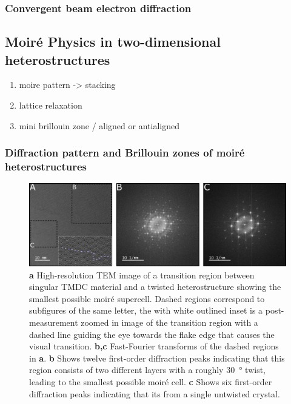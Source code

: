 \subsubsection{Convergent beam electron diffraction}



\subsection{Moiré Physics in two-dimensional heterostructures}
\begin{enumerate}
    \item moire pattern -> stacking
    \item lattice relaxation
    \item mini brillouin zone / aligned or antialigned
\end{enumerate}

\subsubsection{Diffraction pattern and Brillouin zones of moiré heterostructures}
\begin{figure}[h]
    \centering
    \includegraphics[width=1\linewidth, keepaspectratio]{resources/Figures/moire_transition.png}
    \caption{\textbf{a} High-resolution TEM image of a transition region between singular TMDC material and a twisted heterostructure showing the smallest possible moiré supercell. Dashed regions correspond to subfigures of the same letter, the with white outlined inset is a post-measurement zoomed in image of the transition region with a dashed line guiding the eye towards the flake edge that causes the visual transition. \textbf{b,c} Fast-Fourier transforms of the dashed regions in \textbf{a}. \textbf{b} Shows twelve first-order diffraction peaks indicating that this region consists of two different layers with a roughly \SI{30}{\degree} twist, leading to the smallest possible moiré cell. \textbf{c} Shows six first-order diffraction peaks indicating that its from a single untwisted  crystal. }
    \label{fig:moire_trans}
\end{figure}

